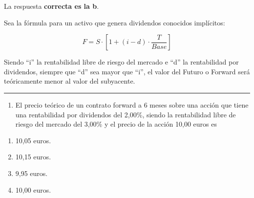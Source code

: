 \documentclass[
  letterpaper,
  DIV=11,
  numbers=noendperiod]{scrreprt}
\providecommand{\tightlist}{%
  \setlength{\itemsep}{0pt}\setlength{\parskip}{0pt}}\usepackage{longtable,booktabs,array}
\begin{document}
\begin{tcolorbox}[enhanced jigsaw, left=2mm, opacityback=0, colback=white, breakable, arc=.35mm, bottomrule=.15mm, rightrule=.15mm, toprule=.15mm, leftrule=.75mm, colframe=quarto-callout-tip-color-frame]
\begin{minipage}[t]{5.5mm}
\textcolor{quarto-callout-tip-color}{\faLightbulb}
\end{minipage}%
\begin{minipage}[t]{\textwidth - 5.5mm}

La respuesta \textbf{correcta es la b}.

Sea la fórmula para un activo que genera dividendos conocidos
implícitos:

\[F=S\cdot\left[1+(i-d)\cdot\frac{T}{Base}\right]\]

Siendo ``i'' la rentabilidad libre de riesgo del mercado e ``d'' la
rentabilidad por dividendos, siempre que ``d'' sea mayor que ``i'', el
valor del Futuro o Forward será teóricamente menor al valor del
subyacente.

\end{minipage}%
\end{tcolorbox}

\begin{center}\rule{0.5\linewidth}{0.5pt}\end{center}

\begin{enumerate}
\def\labelenumi{\arabic{enumi}.}
\setcounter{enumi}{5}
\tightlist
\item
  El precio teórico de un contrato forward a 6 meses sobre una acción
  que tiene una rentabilidad por dividendos del 2,00\%, siendo la
  rentabilidad libre de riesgo del mercado del 3,00\% y el precio de la
  acción 10,00 euros es
\end{enumerate}

\begin{enumerate}
\def\labelenumi{\alph{enumi})}
\item
  10,05 euros.
\item
  10,15 euros.
\item
  9,95 euros.
\item
  10,00 euros.
\end{enumerate}
\end{document}
